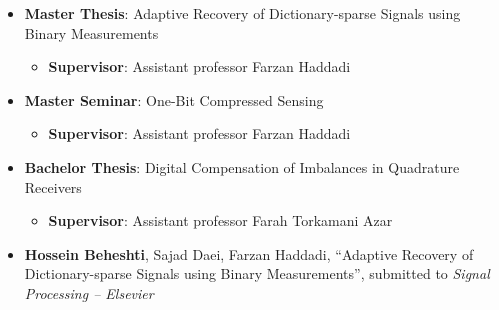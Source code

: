 
\begin{itemize}
	\item{
	      \textbf{Master Thesis}: Adaptive Recovery of Dictionary-sparse Signals using Binary Measurements
	      \begin{itemize}
		      \item \textbf{Supervisor}: Assistant professor Farzan Haddadi
	      \end{itemize}
	      }
	\item{
	      \textbf{Master Seminar}: One-Bit Compressed Sensing
	      \begin{itemize}
		      \item \textbf{Supervisor}: Assistant professor Farzan Haddadi
	      \end{itemize}
	      }
	\item{
	      \textbf{Bachelor Thesis}: Digital Compensation of Imbalances in Quadrature Receivers
	      \begin{itemize}
		      \item \textbf{Supervisor}: Assistant professor Farah Torkamani Azar
	      \end{itemize}
	      }

	\item{
	      \textbf{Hossein Beheshti}, Sajad Daei, Farzan Haddadi, ``Adaptive Recovery of Dictionary-sparse Signals using Binary Measurements'',
	      submitted to \emph{Signal Processing -- Elsevier}
	      }
	      \\
\end{itemize}